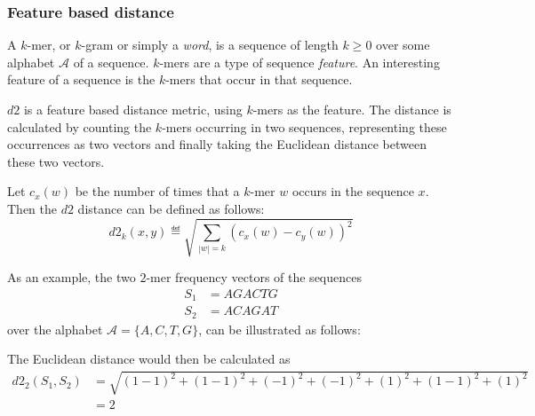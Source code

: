 \subsubsection{Feature based distance}
A $k$-mer, or $k$-gram or simply a \emph{word}, is a sequence of length
$k \geq 0$ over some alphabet $\mathcal{A}$ of a sequence. $k$-mers are a type
of sequence \emph{feature}. An interesting feature of a sequence is the
$k$-mers that occur in that sequence.

$d2$ is a feature based distance metric, using $k$-mers as the feature. The
distance is calculated by counting the $k$-mers occurring in two sequences,
representing these occurrences as two vectors and finally taking the Euclidean
distance between these two vectors.

Let $c_x(w)$ be the number of times that a $k$-mer $w$ occurs in the sequence
$x$. Then the $d2$ distance can be defined as follows:
\begin{equation}
  d2_k(x,y) \eqdef \sqrt{\sum_{|w|=k} (c_x(w) - c_y(w))^2}
\end{equation}

As an example, the two $2$-mer frequency vectors of the sequences
\begin{align*}
  S_1 &= AGACTG \\
  S_2 &= ACAGAT
\end{align*}
over the alphabet $\mathcal{A} = \{A,C,T,G\}$, can be illustrated as follows:

\begin{table}[!h]
\centering
{}
\end{table}

The Euclidean distance would then be calculated as
\begin{align*}
  d2_2(S_1, S_2)
    &= \sqrt{(1-1)^2 + (1-1)^2 + (-1)^2 + (-1)^2 + (1)^2 + (1-1)^2 + (1)^2} \\
    &= 2
\end{align*}

